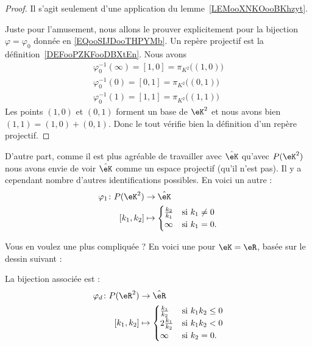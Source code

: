 \begin{proof}
	Il s'agit seulement d'une application du lemme~\ref{LEMooXNKOooBKhzyt}.

	Juste pour l'amusement, nous allons le prouver explicitement pour la bijection \( \varphi=\varphi_0\) donnée en \eqref{EQooSIJDooTHPYMb}. Un repère projectif est la définition~\ref{DEFooPZKFooDBXtEn}. Nous avons
	\begin{subequations}
		\begin{align}
			\varphi_0^{-1}(\infty)=[1,0]=\pi_{K^2}\big( (1,0) \big) \\
			\varphi_0^{-1}(0)=[0,1]=\pi_{K^2}\big( (0,1) \big)      \\
			\varphi_0^{-1}(1)=[1,1]=\pi_{K^2}\big( (1,1) \big)
		\end{align}
	\end{subequations}
	Les points \( (1,0)\) et \( (0,1)\) forment un base de \( \eK^2\) et nous avons bien \( (1,1)=(1,0)+(0,1)\). Donc le tout vérifie bien la définition d'un repère projectif.
\end{proof}

D'autre part, comme il est plus agréable de travailler avec \( \hat\eK\) qu'avec \( P(\eK^2)\) nous avons envie de voir \( \hat\eK\) comme un espace projectif (qu'il n'est pas). Il y a cependant nombre d'autres identifications possibles. En voici un autre :
\begin{equation}
	\begin{aligned}
		\varphi_1\colon P(\eK^2) & \to \hat\eK                        \\
		[k_1,k_2]                & \mapsto \begin{cases}
			\frac{ k_2 }{ k_1 } & \text{si  } k_1\neq 0 \\
			\infty              & \text{si } k_1=0.
		\end{cases}
	\end{aligned}
\end{equation}

Vous en voulez une plus compliquée ? En voici une pour \( \eK=\eR\), basée sur le dessin suivant :
\begin{center}
	
\end{center}

La bijection associée est :
\begin{equation}        \label{EQooMIGCooAtXPaS}
	\begin{aligned}
		\varphi_d\colon P(\eR^2) & \to \hat\eR                         \\
		[k_1,k_2]                & \mapsto \begin{cases}
			\frac{ k_1 }{ k_2 }  & \text{si } k_1k_2\leq 0 \\
			2\frac{ k_1 }{ k_2 } & \text{si } k_1k_2<0     \\
			\infty               & \text{si } k_2=0.
		\end{cases}
	\end{aligned}
\end{equation}

